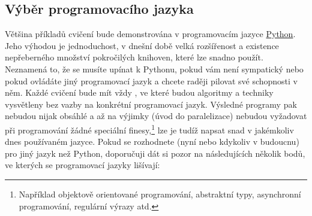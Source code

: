 \documentclass[a4paper,11pt,twoside]{article}
\theoremstyle{red}
\theoremstyle{green}
\begin{document}
    \subsection{Výběr programovacího jazyka}
        Většina příkladů cvičení bude demonstrována v programovacím jazyce \href{https://python.org}{Python}.
        Jeho výhodou je jednoduchost, v dnešní době velká rozšířenost a existence nepřeberného množství pokročilých knihoven, které lze snadno použít.
        Neznamená to, že se musíte upínat k Pythonu, pokud vám není sympatický nebo pokud ovládáte jiný programovací jazyk a chcete raději pilovat své schopnosti v něm.
        Každé cvičení bude mít vždy , ve které budou algoritmy a techniky vysvětleny bez vazby na konkrétní programovací jazyk.
        Výsledné programy pak nebudou nijak obsáhlé a až na výjimky (úvod do paralelizace) nebudou vyžadovat při programování žádné speciální finesy,\footnote{Například objektově orientované programování, abstraktní typy, asynchronní programování, regulární výrazy atd.}
        lze je tudíž napsat snad v jakémkoliv dnes používaném jazyce.
        Pokud se rozhodnete (nyní nebo kdykoliv v budoucnu) pro jiný jazyk než Python, doporučuji dát si pozor na následujících několik bodů, ve kterých se programovací jazyky lišívají:
\end{document}
